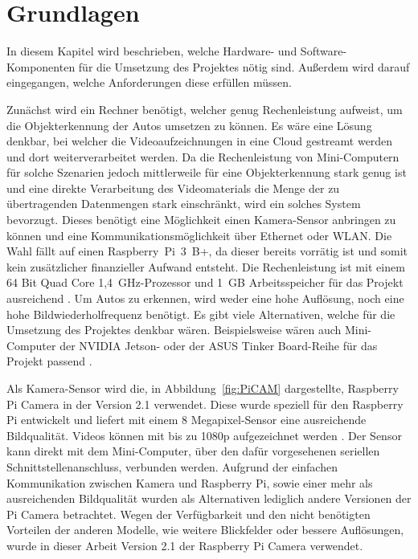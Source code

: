 \section{Grundlagen}\label{ch:Grundlagen}
In diesem Kapitel wird beschrieben, welche Hardware- und Software-Komponenten für die Umsetzung des Projektes nötig sind.
Außerdem wird darauf eingegangen, welche Anforderungen diese erfüllen müssen.

Zunächst wird ein Rechner benötigt, welcher genug Rechenleistung aufweist, um die Objekterkennung der Autos umsetzen zu können.
Es wäre eine Lösung denkbar, bei welcher die Videoaufzeichnungen in eine Cloud gestreamt werden und dort weiterverarbeitet werden.
Da die Rechenleistung von Mini-Computern für solche Szenarien jedoch mittlerweile für eine Objekterkennung stark genug ist und eine direkte Verarbeitung des Videomaterials die Menge der zu übertragenden Datenmengen stark einschränkt, wird ein solches System bevorzugt.
Dieses benötigt eine Möglichkeit einen Kamera-Sensor anbringen zu können und eine Kommunikationsmöglichkeit über Ethernet oder WLAN.
Die Wahl fällt auf einen Raspberry~Pi~3~B+, da dieser bereits vorrätig ist und somit kein zusätzlicher finanzieller Aufwand entsteht.
Die Rechenleistung ist mit einem 64 Bit Quad Core 1,4~GHz-Prozessor und 1~GB Arbeitsspeicher für das Projekt ausreichend \cite{pi3}.
Um Autos zu erkennen, wird weder eine hohe Auflösung, noch eine hohe Bildwiederholfrequenz benötigt.
Es gibt viele Alternativen, welche für die Umsetzung des Projektes denkbar wären.
Beispielsweise wären auch Mini-Computer der NVIDIA Jetson- oder der ASUS Tinker Board-Reihe für das Projekt passend \cite{jetson} \cite{tinkerBoard}.

Als Kamera-Sensor wird die, in Abbildung~\ref{fig:PiCAM} dargestellte, Raspberry Pi Camera in der Version 2.1 verwendet.
Diese wurde speziell für den Raspberry Pi entwickelt und liefert mit einem 8 Megapixel-Sensor eine ausreichende Bildqualität.
Videos können mit bis zu 1080p aufgezeichnet werden \cite{piCAM}.
Der Sensor kann direkt mit dem Mini-Computer, über den dafür vorgesehenen seriellen Schnittstellenanschluss, verbunden werden.
Aufgrund der einfachen Kommunikation zwischen Kamera und Raspberry Pi, sowie einer mehr als ausreichenden Bildqualität wurden als Alternativen lediglich andere Versionen der Pi Camera betrachtet.
Wegen der Verfügbarkeit und den nicht benötigten Vorteilen der anderen Modelle, wie weitere Blickfelder oder bessere Auflösungen, wurde in dieser Arbeit Version 2.1 der Raspberry Pi Camera verwendet.

